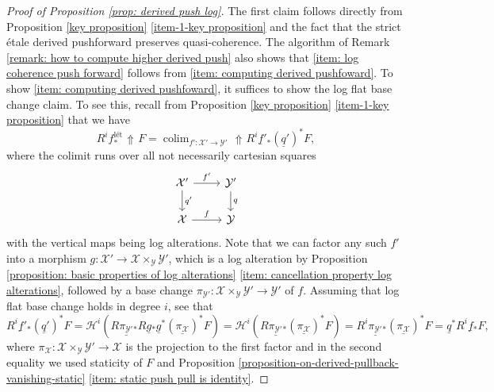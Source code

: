 \documentclass[11pt]{amsart}
\theoremstyle{definition}
\theoremstyle{definition}
\DeclareMathOperator{\arrowup}{\!\Uparrow \!}
\begin{document}
\begin{proof}[Proof of Proposition \ref{prop: derived push log}]
    The first claim follows directly from Proposition \ref{key proposition} \eqref{item-1-key proposition} and the fact that the strict \'etale derived pushforward preserves quasi-coherence. The algorithm of Remark \ref{remark: how to compute higher derived push} also shows that \eqref{item: log coherence push forward} follows from \eqref{item: computing derived pushfoward}. To show \eqref{item: computing derived pushfoward}, it suffices to show the log flat base change claim. To see this, recall from Proposition \ref{key proposition} \eqref{item-1-key proposition} that we have 
    \begin{equation}\label{equation: shitty fuckfuck}
        R^{i}f^\text{l\'et}_*\arrowup F = \mathop{\text{colim}}_{f'\colon\mathcal{X}'\rightarrow\mathcal{Y}'} \arrowup R^{i}\underline{f}{}'_*(\underline{q}')^*F,
    \end{equation}
    where the colimit runs over all not necessarily cartesian squares
    \begin{equation*}
        \begin{tikzcd}
            \mathcal{X}'\dar["q'"]\rar["f'"] &\mathcal{Y}'\dar["q"]\\ \mathcal{X} \rar["f"]&\mathcal{Y}
        \end{tikzcd}
    \end{equation*}
    with the vertical maps being log alterations. Note that we can factor any such $f'$ into a morphism $g\colon \mathcal{X}'\rightarrow\mathcal{X}\times_\mathcal{Y}\mathcal{Y}'$, which is a log alteration by Proposition \ref{proposition: basic properties of log alterations} \eqref{item: cancellation property log alterations}, followed by a base change $\pi_{\mathcal{Y}'}\colon \mathcal{X}\times_\mathcal{Y}\mathcal{Y}'\rightarrow\mathcal{Y}'$ of $f$. Assuming that log flat base change holds in degree $i$, see that 
    \[
        R^{i}\underline{f}{}'_*(\underline{q}')^*F = \mathcal{H}^{i}(R\underline{\pi_{\mathcal{Y}'}}{}_*R\underline{g}{}_*\underline{g}^*(\underline{\pi_{\mathcal{X}}})^*F) = \mathcal{H}^{i}(R\underline{\pi_{\mathcal{Y}'}}{}_*(\underline{\pi_{\mathcal{X}}})^*F) = R^{i}\underline{\pi_{\mathcal{Y}'}}{}_*(\underline{\pi_{\mathcal{X}}})^*F = \underline{q}^*R^{i}\underline{f}{}_*F,
    \]
    where $\pi_{\mathcal{X}}\colon \mathcal{X}\times_\mathcal{Y}\mathcal{Y}'\rightarrow\mathcal{X}$ is the projection to the first factor and in the second equality we used staticity of $F$ and Proposition \ref{proposition-on-derived-pullback-vanishing-static} \eqref{item: static push pull is identity}.


\end{proof}
\end{document}
